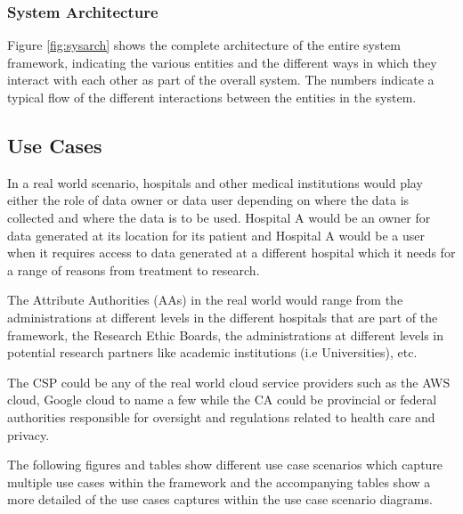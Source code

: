 \subsubsection{System Architecture}

Figure \ref{fig:sysarch} shows the complete architecture of the entire system framework, indicating the various entities and the different ways in which they interact with each other as part of the overall system. The numbers indicate a typical flow of the different interactions between the entities in the system.

\subsection{Use Cases}

In a real world scenario, hospitals and other medical institutions would play either the role of data owner or data user depending on where the data is collected and where the data is to be used. Hospital A would be an owner for data generated at its location for its patient and Hospital A would be a user when it requires access to data generated at a different hospital which it needs for a range of reasons from treatment to research.

The Attribute Authorities (AAs) in the real world would range from the administrations at different levels in the different hospitals that are part of the framework, the Research Ethic Boards, the administrations at different levels in potential research partners like academic institutions (i.e Universities), etc.

The CSP could be any of the real world cloud service providers such as the AWS cloud, Google cloud to name a few while the CA could be provincial or federal authorities responsible for oversight and regulations related to health care and privacy.

The following figures and tables show different use case scenarios which capture multiple use cases within the framework and the accompanying tables show a more detailed of the use cases captures within the use case scenario diagrams.




